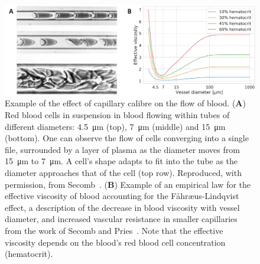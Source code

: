 \documentclass{article}
\begin{document}
\begin{figure}[t!]
  \centering
  \includegraphics[width=1\textwidth]{EffectiveViscosity}
  \caption{Example of the effect of capillary calibre on the flow of blood. (\textbf{A}) Red blood cells in suspension in blood flowing within tubes of different diameters: \SI{4.5}{\micro\meter} (top), \SI{7}{\micro\meter} (middle) and \SI{15}{\micro\meter} (bottom). One can observe the flow of cells converging into a single file, surrounded by a layer of plasma as the diameter moves from \SI{15}{\micro\meter} to \SI{7}{\micro\meter}. A cell's shape adapts to fit into the tube as the diameter approaches that of the cell (top row). Reproduced, with permission, from Secomb~\cite{Secomb_2003}. (\textbf{B}) Example of an empirical law for the effective viscosity of blood accounting for the F\r{a}hr\ae us-Lindqvist effect, a description of the decrease in blood viscosity with vessel diameter, and increased vascular resistance in smaller capillaries from the work of Secomb and Pries~\cite{Secomb_2013}. Note that the effective viscosity depends on the blood's red blood cell concentration (hematocrit).}
  \label{fig:effectiveViscosity}
\end{figure}
\end{document}

